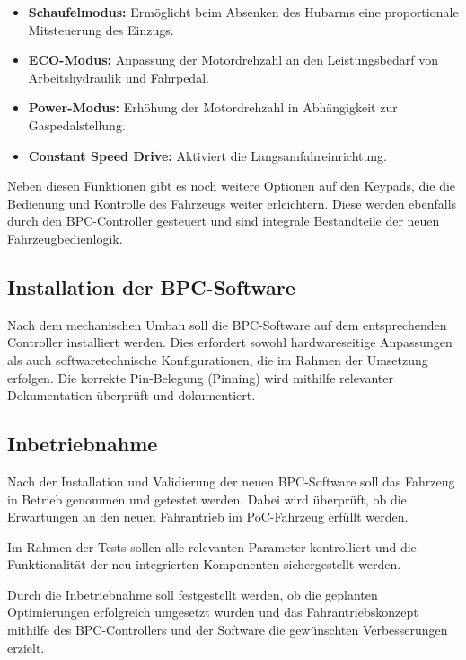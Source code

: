 \documentclass[a4paper, 12pt]{article} %
\begin{document}
\begin{spacing}{1.5}
\begin{itemize}
    \item \textbf{Schaufelmodus:} Ermöglicht beim Absenken des Hubarms eine proportionale Mitsteuerung des Einzugs.
    
    \item \textbf{ECO-Modus:} Anpassung der Motordrehzahl an den Leistungsbedarf von Arbeitshydraulik und Fahrpedal.
    
    \item \textbf{Power-Modus:} Erhöhung der Motordrehzahl in Abhängigkeit zur Gaspedalstellung.
    
    \item \textbf{Constant Speed Drive:} Aktiviert die Langsamfahreinrichtung.
    
\end{itemize}

Neben diesen Funktionen gibt es noch weitere Optionen auf den Keypads, die die Bedienung und Kontrolle des Fahrzeugs weiter erleichtern. Diese werden ebenfalls durch den BPC-Controller gesteuert und sind integrale Bestandteile der neuen Fahrzeugbedienlogik.


 \subsection{Installation der BPC-Software}
 Nach dem mechanischen Umbau soll die \acs{BPC}-Software auf dem entsprechenden Controller installiert werden.
 Dies erfordert sowohl hardwareseitige Anpassungen als auch softwaretechnische Konfigurationen, die im Rahmen der Umsetzung erfolgen.
 Die korrekte Pin-Belegung (Pinning) wird mithilfe relevanter Dokumentation überprüft und dokumentiert.
 

 \subsection{Inbetriebnahme}
 Nach der Installation und Validierung der neuen \acs{BPC}-Software soll das Fahrzeug in Betrieb genommen und getestet werden. Dabei wird überprüft, 
 ob die Erwartungen an den neuen Fahrantrieb im \acs{PoC}-Fahrzeug erfüllt werden.
 
 Im Rahmen der Tests sollen alle relevanten Parameter kontrolliert und 
 die Funktionalität der neu integrierten Komponenten sichergestellt werden. 
 
 Durch die Inbetriebnahme soll festgestellt werden, 
 ob die geplanten Optimierungen erfolgreich umgesetzt wurden und das Fahrantriebskonzept mithilfe des BPC-Controllers und der Software die gewünschten Verbesserungen erzielt.
 
 
\end{spacing}
\end{document}
